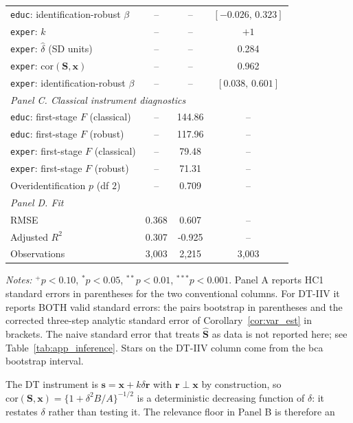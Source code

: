 \begin{table}[htbp]
\begin{threeparttable}
\begin{tabular}{lccc}
\quad \texttt{educ}: identification-robust $\beta$ & -- & -- & $[-0.026,\,0.323]$ \\
\quad \texttt{exper}: $\widehat k$ & -- & -- & $+1$ \\
\quad \texttt{exper}: $\widehat\delta$ (SD units) & -- & -- & 0.284 \\
\quad \texttt{exper}: $\mathrm{cor}(\mathbf S,\mathbf x)$ & -- & -- & 0.962 \\
\quad \texttt{exper}: identification-robust $\beta$ & -- & -- & $[0.038,\,0.601]$ \\[3pt]
\midrule
\multicolumn{4}{l}{\emph{Panel C. Classical instrument diagnostics}} \\
\quad \texttt{educ}: first-stage $F$ (classical) & -- & 144.86 & -- \\
\quad \texttt{educ}: first-stage $F$ (robust) & -- & 117.96 & -- \\
\quad \texttt{exper}: first-stage $F$ (classical) & -- & 79.48 & -- \\
\quad \texttt{exper}: first-stage $F$ (robust) & -- & 71.31 & -- \\
\quad Overidentification $p$ (df $2$) & -- & 0.709 & -- \\[3pt]
\midrule
\multicolumn{4}{l}{\emph{Panel D. Fit}} \\
\quad RMSE & 0.368 & 0.607 & -- \\
\quad Adjusted $R^2$ & 0.307 & -0.925 & -- \\
\quad Observations & 3{,}003 & 2{,}215 & 3{,}003 \\
\bottomrule
\end{tabular}
\begin{tablenotes}
\small
\item \textit{Notes:} $^{+}p<0.10$, $^{*}p<0.05$, $^{**}p<0.01$,
$^{***}p<0.001$. Panel A reports HC1 standard errors in parentheses for
the two conventional columns. For DT-IIV it reports BOTH valid standard
errors: the pairs bootstrap in parentheses and the corrected three-step
analytic standard error of Corollary~\ref{cor:var_est} in brackets. The
naive standard error that treats $\widehat{\mathbf S}$ as data is not
reported here; see Table~\ref{tab:app_inference}. Stars on the DT-IIV
column come from the bca bootstrap interval.
\item The DT instrument is $\mathbf s=\mathbf x+k\delta\mathbf r$ with
$\mathbf r\perp\mathbf x$ by construction, so
$\mathrm{cor}(\mathbf S,\mathbf x)=\{1+\delta^2 B/A\}^{-1/2}$ is a
deterministic decreasing function of $\delta$: it restates $\delta$ rather
than testing it. The relevance floor in Panel B is therefore an

\end{tablenotes}
\end{threeparttable}
\end{table}
